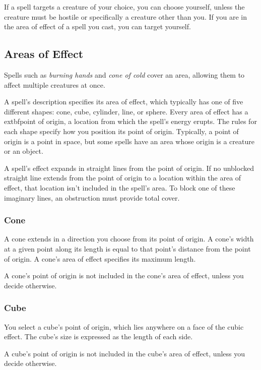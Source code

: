 If a spell targets a creature of your choice, you can choose yourself, unless the creature must be hostile or specifically a creature other than you. If you are in the area of effect of a spell you cast, you can target yourself.

\subsection{Areas of Effect}\label{subsec:areas-of-effect}

Spells such as \textit{burning hands} and \textit{cone of cold} cover an area, allowing them to affect multiple creatures at once.

A spell's description specifies its area of effect, which typically has one of five different shapes: cone, cube, cylinder, line, or sphere. Every area of effect has a 	extbf{point of origin}, a location from which the spell's energy erupts. The rules for each shape specify how you position its point of origin. Typically, a point of origin is a point in space, but some spells have an area whose origin is a creature or an object.

A spell's effect expands in straight lines from the point of origin. If no unblocked straight line extends from the point of origin to a location within the area of effect, that location isn't included in the spell's area. To block one of these imaginary lines, an obstruction must provide total cover.

\subsubsection{Cone}

A cone extends in a direction you choose from its point of origin. A cone's width at a given point along its length is equal to that point's distance from the point of origin. A cone's area of effect specifies its maximum length.

A cone's point of origin is not included in the cone's area of effect, unless you decide otherwise.

\subsubsection{Cube}

You select a cube's point of origin, which lies anywhere on a face of the cubic effect. The cube's size is expressed as the length of each side.

A cube's point of origin is not included in the cube's area of effect, unless you decide otherwise.

